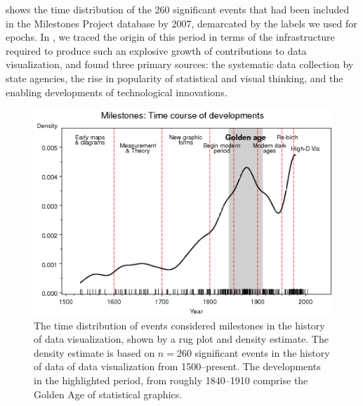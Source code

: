  shows the time distribution of the 260 significant 
events that had been included in the Milestones Project database by 2007, 
demarcated by the labels we used for epochs.
In \citet{Friendly:2008:golden}, we traced the origin of this period in terms 
of the infrastructure required to produce such an explosive growth of 
contributions to data visualization, and found three primary sources: the 
systematic data collection by state agencies, the rise in popularity of 
statistical and visual thinking, and the enabling developments of technological 
innovations.
\begin{figure}[!htb]
  \centering
  \includegraphics[width=.9\textwidth,clip]{fig/mileyears4}
  \caption{The time distribution of events considered milestones in the history 
of data visualization, shown by a rug plot and density estimate.
The density estimate is based on $n=260$ significant events in the history of 
data of data visualization from 1500--present.
The developments in the highlighted period, from roughly 1840--1910 comprise 
the Golden Age of statistical graphics.}
  \label{fig:mileyears4}
\end{figure}